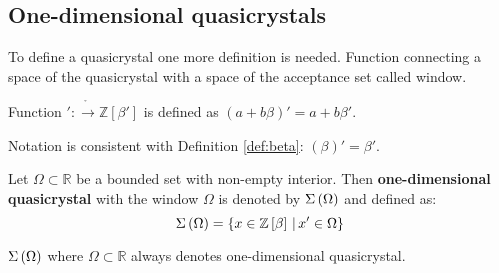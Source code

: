\documentclass[text.tex]{subfiles}
\begin{document}
\subsection{One-dimensional quasicrystals}

To define a quasicrystal one more definition is needed. Function connecting a space of the quasicrystal with a space of the acceptance set called window.

\begin{definition}
Function $':\ring\to\mathbb{Z}[\beta']$ is defined as $(a+b\beta)' = a+b\beta'$.
\end{definition}
\begin{remark}
Notation is consistent with Definition \ref{def:beta}: $(\beta)'=\beta'$.
\end{remark}

\begin{definition}
\label{def_oneDimension}
Let $\Omega \subset \mathbb{R}$ be a bounded set with non-empty interior. Then \textbf{one-dimensional quasicrystal} with the window $\Omega$ is denoted by $\Sigma\left(\Omega\right)$ and defined as:
$$\Sigma\left(\Omega\right) = \{ x\in \mathbb{Z}\left[\beta\right] \,|\, x'\in \Omega\}$$
\end{definition}

\begin{remark}
$\Sigma\left(\Omega\right)$ where $\Omega \subset \mathbb{R}$ always denotes one-dimensional quasicrystal.
\end{remark}
\end{document}
